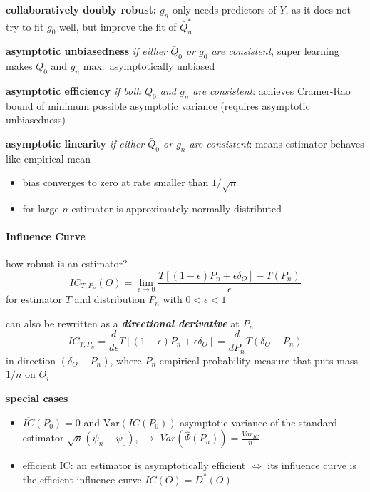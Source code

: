 \documentclass[8pt,twoside]{extarticle}
\begin{document}
\begin{multicols}{2}
 \textbf{collaboratively doubly robust:} $g_n$ only needs predictors of $Y$, as it does not try to fit $g_0$ well, but improve the fit of $\bar{Q}^*_n$

 \textbf{asymptotic unbiasedness}
\textit{if either $\bar{Q}_0$ or $g_0$ are consistent}, super learning makes $\bar{Q}_0$ and $g_n$ max.\ asymptotically unbiased

 \textbf{asymptotic efficiency} \textit{if both $\bar{Q}_0$ and $g_n$ are consistent}: achieves Cramer-Rao bound of minimum possible asymptotic variance (requires asymptotic unbiasedness)

 \textbf{asymptotic linearity} \textit{if either  $\bar{Q}_0$ or $g_n$ are consistent}: \newline means estimator behaves like empirical mean
\begin{itemize}[leftmargin=*, itemsep=0em, topsep=0pt, partopsep=0pt,parsep=0pt]
\setlength{\itemsep}{0pt}%
\setlength{\parskip}{0pt}
\item bias converges to zero at rate smaller than $1/\sqrt{n}$
\item for large $n$ estimator is approximately normally distributed
\end{itemize}

\paragraph{Influence Curve} how robust is an estimator? %
$$IC_{T,P_n}(O)=\lim_{\epsilon\to 0}\frac{T\left[\left(1-\epsilon\right)P_n + \epsilon\delta_O\right]-T(P_n)}{\epsilon}$$
for estimator $T$ and distribution $P_n$ with $0<\epsilon<1$ 


 can also be rewritten as a \textit{\textbf{directional derivative}} at $P_n$
$$IC_{T,P_n}=\frac{d}{d\epsilon}T\left[\left(1-\epsilon\right)P_n + \epsilon\delta_O\right] = 
\frac{d}{dP_n}T\left(\delta_O - P_n\right)$$
in direction $(\delta_O - P_n)$, where $P_n$ empirical probability measure that puts mass $1/n$ on $O_i$ \citep{hampel1974influence}


 \textbf{special cases} \citep{van2011targeted}
\begin{itemize}[leftmargin=*, itemsep=0em, topsep=0pt, partopsep=0pt,parsep=0pt]
\item $\overline{IC}(P_0) = 0$ and $\mathrm{Var}(IC(P_0))$ asymptotic variance of the standard estimator  $\sqrt{n} (\psi_n - \psi_0)$, $\to$ $Var(\hat{\Psi}(P_n)) = \frac{Var_{IC}}{n}$
\item efficient IC: an estimator is asymptotically efficient $\Leftrightarrow$ its influence curve is the efficient influence curve $IC(O)=D^*(O)$ 
\end{itemize}






\end{multicols}
\end{document}
